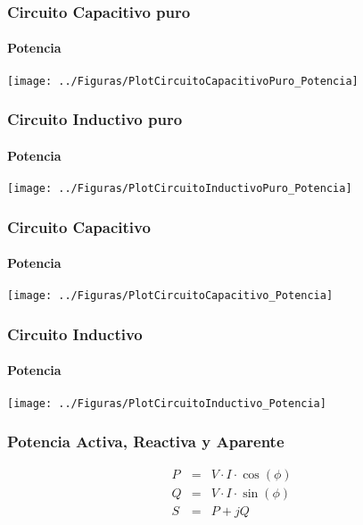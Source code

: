 \documentclass[serif, xcolor=dvipsnames]{beamer}
\begin{document}
\begin{frame}[plain]
  \frametitle{Circuito Capacitivo puro}


  \framesubtitle{Potencia}

  \begin{center}
    \texttt{[image: ../Figuras/PlotCircuitoCapacitivoPuro\_Potencia]}
    \par\end{center}


\end{frame}
\begin{frame}[plain]
  \frametitle{Circuito Inductivo puro}


  \framesubtitle{Potencia}

  \begin{center}
    \texttt{[image: ../Figuras/PlotCircuitoInductivoPuro\_Potencia]}
    \par\end{center}


\end{frame}
\begin{frame}[plain]
  \frametitle{Circuito Capacitivo}


  \framesubtitle{Potencia}

  \begin{center}
    \texttt{[image: ../Figuras/PlotCircuitoCapacitivo\_Potencia]}
    \par\end{center}


\end{frame}
\begin{frame}[plain]
  \frametitle{Circuito Inductivo}


  \framesubtitle{Potencia}

  \begin{center}
    \texttt{[image: ../Figuras/PlotCircuitoInductivo\_Potencia]}
    \par\end{center}


\end{frame}
\begin{frame}
  \frametitle{Potencia Activa, Reactiva y Aparente}

\begin{eqnarray*}
  P & = & V\cdot I\cdot\cos(\phi)\\
  Q & = & V\cdot I\cdot\sin(\phi)\\
  S & = & P+jQ
\end{eqnarray*}



\end{frame}
\end{document}
